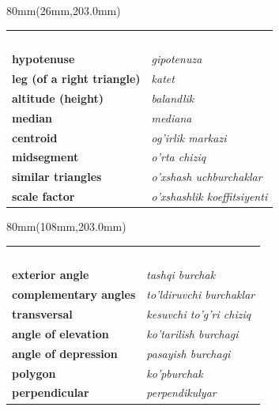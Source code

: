 \documentclass[a4paper]{article}
\begin{document}
\begin{textblock*}{80mm}(26mm,203.0mm)
{\fontsize{10.5}{12}\selectfont
\begin{tabular}{@{}>{\bfseries}p{37mm}p{36mm}@{}}
\cellcolor{accent}\textcolor{white}{\sffamily English} & \cellcolor{accent}\textcolor{white}{\sffamily O'zbekcha}\\
\rowcolor{badge!45} hypotenuse & {\itshape gipotenuza}\\
\rowcolor{white} leg (of a right triangle) & {\itshape katet}\\
\rowcolor{badge!45} altitude (height) & {\itshape balandlik}\\
\rowcolor{white} median & {\itshape mediana}\\
\rowcolor{badge!45} centroid & {\itshape og'irlik markazi}\\
\rowcolor{white} midsegment & {\itshape o'rta chiziq}\\
\rowcolor{badge!45} similar triangles & {\itshape o'xshash uchburchaklar}\\
\rowcolor{white} scale factor & {\itshape o'xshashlik koeffitsiyenti}\\
\end{tabular}}
\end{textblock*}
\begin{textblock*}{80mm}(108mm,203.0mm)
{\fontsize{10.5}{12}\selectfont
\begin{tabular}{@{}>{\bfseries}p{37mm}p{36mm}@{}}
\cellcolor{accent}\textcolor{white}{\sffamily English} & \cellcolor{accent}\textcolor{white}{\sffamily O'zbekcha}\\
\rowcolor{badge!45} exterior angle & {\itshape tashqi burchak}\\
\rowcolor{white} complementary angles & {\itshape to'ldiruvchi burchaklar}\\
\rowcolor{badge!45} transversal & {\itshape kesuvchi to'g'ri chiziq}\\
\rowcolor{white} angle of elevation & {\itshape ko'tarilish burchagi}\\
\rowcolor{badge!45} angle of depression & {\itshape pasayish burchagi}\\
\rowcolor{white} polygon & {\itshape ko'pburchak}\\
\rowcolor{badge!45} perpendicular & {\itshape perpendikulyar}\\
\end{tabular}}
\end{textblock*}
\end{document}
